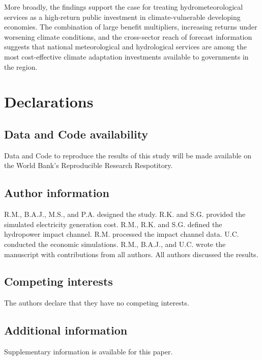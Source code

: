 \documentclass[
  final,
  10pt,
  letterpaper,
  english,
]{article}
\begin{document}
More broadly, the findings support the case for treating hydrometeorological
services as a high-return public investment in climate-vulnerable developing
economies. The combination of large benefit multipliers, increasing returns
under worsening climate conditions, and the cross-sector reach of forecast
information suggests that national meteorological and hydrological services are
among the most cost-effective climate adaptation investments available to
governments in the region.



\clearpage


\printbibliography[heading=bibintoc]

\clearpage
\FloatBarrier


\section*{Declarations}

\subsection*{Data and Code availability}
Data and Code to reproduce the results of this study will be made available on
the World Bank's Reproducible Research Respotitory. 


\subsection*{Author information}
R.M., B.A.J., M.S., and P.A. designed the study. R.K. and S.G. provided the
simulated electricity generation cost. R.M., R.K. and S.G. defined the
hydropower impact channel. R.M. processed the impact channel data. U.C.
conducted the economic simulations. R.M., B.A.J., and U.C. wrote the manuscript
with contributions from all authors. All authors discussed the results.

\subsection*{Competing interests}
The authors declare that they have no competing interests.

\subsection*{Additional information}
Supplementary information is available for this paper.

\clearpage
\FloatBarrier
\appendix
\end{document}
